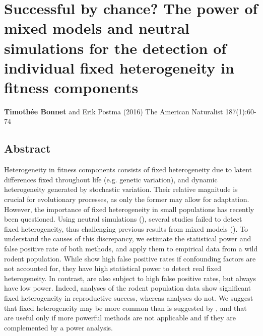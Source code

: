 
\chapter[\texorpdfstring{Chapter 2 \\Successful by chance? The power of mixed models and neutral simulations for the detection of individual fixed heterogeneity in fitness components}{Chapter 2 -- Successful by chance? The power of mixed models and neutral simulations for the detection of individual fixed heterogeneity in fitness components}]{Successful by chance? The power of mixed models and neutral simulations for the detection of individual fixed heterogeneity in fitness components}
\label{chap:dynhet}

\textbf{Timoth\'{e}e Bonnet} and Erik Postma (2016) The American Naturalist 187(1):60-74\\

\section{Abstract}
Heterogeneity in fitness components consists of fixed heterogeneity due to latent differences fixed throughout life (e.g. genetic variation), and dynamic heterogeneity generated by stochastic variation. Their relative magnitude is crucial for evolutionary processes, as only the former may allow for adaptation. 
However, the importance of fixed heterogeneity in small populations has recently been questioned. Using neutral simulations (\NSM), several studies failed to detect fixed heterogeneity, thus challenging previous results from mixed models (\MM).
To understand the causes of this discrepancy, we estimate the statistical power and false positive rate of both methods, and apply them to empirical data from a wild rodent population.
    While \MM show high false positive rates if confounding factors are not accounted for, they have high statistical power to detect real fixed heterogeneity. In contrast, \NSM are also subject to high false positive rates, but always have low power. Indeed, \MM analyses of the rodent population data show significant fixed heterogeneity in reproductive success, whereas \NSM analyses do not.
   We suggest that fixed heterogeneity may be more common than is suggested by \NSM, and that \NSM are useful only if more powerful methods are not applicable and if they are complemented by a power analysis.

